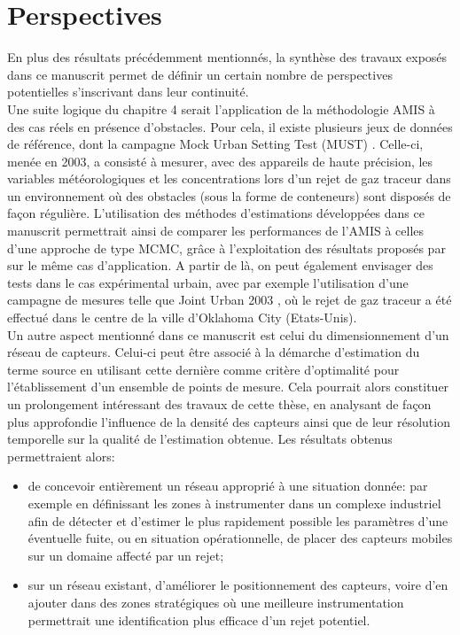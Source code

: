 \section{Perspectives}

En plus des résultats précédemment mentionnés, la synthèse des travaux exposés dans ce manuscrit permet de définir un certain nombre de perspectives potentielles s'inscrivant dans leur continuité.\\

Une suite logique du chapitre 4 serait l'application de la méthodologie AMIS à des cas {réels} en présence d'obstacles. Pour cela, il existe plusieurs jeux de données de référence, dont la campagne Mock Urban Setting Test (MUST) \cite{Yee2004}. Celle-ci, menée en 2003, a consisté à mesurer, avec des appareils de haute précision, les variables météorologiques et les concentrations lors d'un rejet de gaz traceur dans un environnement où des obstacles (sous la forme de conteneurs) sont disposés de façon régulière. L'utilisation des méthodes d'estimations développées dans ce manuscrit permettrait ainsi de comparer les performances de l'AMIS à celles d'une approche de type MCMC, grâce à l'exploitation des résultats proposés par \cite{Keats2007} sur le même cas d'application. A partir de là, on peut également envisager des tests dans le cas expérimental urbain, avec par exemple l'utilisation d'une campagne de mesures telle que Joint Urban 2003 \cite{Allwine2004}, où le rejet de gaz traceur a été effectué dans le centre de la ville d'Oklahoma City (Etats-Unis).\\

Un autre aspect mentionné dans ce manuscrit est celui du dimensionnement d'un réseau de capteurs. Celui-ci peut être associé à la démarche d'estimation du terme source en utilisant cette dernière comme critère d'optimalité pour l'établissement d'un ensemble de points de mesure. Cela pourrait alors constituer un prolongement intéressant des travaux de cette thèse, en analysant de façon plus approfondie l'influence de la densité des capteurs ainsi que de leur résolution temporelle sur la qualité de l'estimation obtenue. Les résultats obtenus permettraient alors: 
\begin{itemize}
	\item de concevoir entièrement un réseau approprié à une situation donnée: par exemple en définissant les zones à instrumenter dans un complexe industriel afin de détecter et d'estimer le plus rapidement possible les paramètres d'une éventuelle fuite, ou en situation opérationnelle, de placer des capteurs mobiles sur un domaine affecté par un rejet;
	\item sur un réseau existant, d'améliorer le positionnement des capteurs, voire d'en ajouter dans des zones stratégiques où une meilleure instrumentation permettrait une identification plus efficace d'un rejet potentiel.
\end{itemize}

